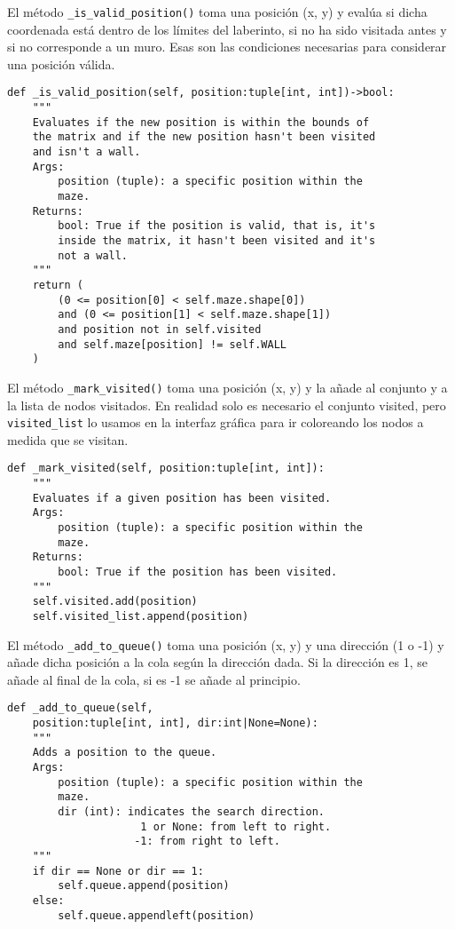 \clearpage
El método \lstinline{_is_valid_position()} toma una posición (x, y) y evalúa si dicha coordenada está dentro de los límites del laberinto, si no ha sido visitada antes y si no corresponde a un muro. Esas son las condiciones necesarias para considerar una posición válida.\\
\begin{lstlisting}
def _is_valid_position(self, position:tuple[int, int])->bool:
    """
    Evaluates if the new position is within the bounds of
    the matrix and if the new position hasn't been visited
    and isn't a wall.
    Args:
        position (tuple): a specific position within the
        maze.
    Returns:
        bool: True if the position is valid, that is, it's
        inside the matrix, it hasn't been visited and it's
        not a wall.
    """
    return (
        (0 <= position[0] < self.maze.shape[0])
        and (0 <= position[1] < self.maze.shape[1])
        and position not in self.visited
        and self.maze[position] != self.WALL
    )
\end{lstlisting}
El método \lstinline{_mark_visited()} toma una posición (x, y) y la añade al conjunto y a la lista de nodos visitados. En realidad solo es necesario el conjunto visited, pero \lstinline{visited_list} lo usamos en la interfaz gráfica para ir coloreando los nodos a medida que se visitan.\\
\begin{lstlisting}
def _mark_visited(self, position:tuple[int, int]):
    """
    Evaluates if a given position has been visited.
    Args:
        position (tuple): a specific position within the
        maze.
    Returns:
        bool: True if the position has been visited.
    """
    self.visited.add(position)
    self.visited_list.append(position)

\end{lstlisting}
\clearpage
El método \lstinline{_add_to_queue()} toma una posición (x, y) y una dirección (1 o -1) y añade dicha posición a la cola según la dirección dada. Si la dirección es 1, se añade al final de la cola, si es -1 se añade al principio.\\
\begin{lstlisting}
def _add_to_queue(self,
    position:tuple[int, int], dir:int|None=None):
    """
    Adds a position to the queue.
    Args:
        position (tuple): a specific position within the
        maze.
        dir (int): indicates the search direction.
                     1 or None: from left to right.
                    -1: from right to left.
    """
    if dir == None or dir == 1:
        self.queue.append(position)
    else:
        self.queue.appendleft(position)

\end{lstlisting}
